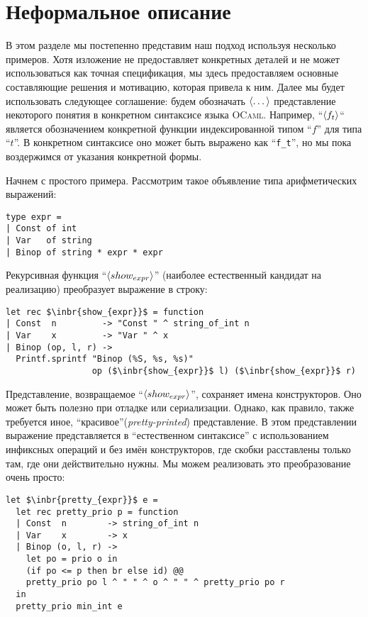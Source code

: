 \section{Неформальное описание}
\label{sec:expo}

В этом разделе мы постепенно представим наш подход используя несколько примеров. 
Хотя изложение не предоставляет конкретных деталей и не может использоваться как точная спецификация,
мы здесь предоставляем основные составляющие решения и мотивацию, которая привела к ним.
Далее мы будет использовать следующее соглашение: будем обозначать $\left<\dots\right>$ представление некоторого понятия в конкретном синтаксисе языка \textsc{OCaml}. Например, ``$\left<f_t\right>$`` является обозначением конкретной функции индексированной типом  ``$f$'' для типа ``$t$''. 
В конкретном синтаксисе оно может быть выражено как ``\lstinline{f_t}'', но мы пока воздержимся от указания конкретной формы.

Начнем с простого примера. Рассмотрим такое объявление типа арифметических выражений:

\begin{lstlisting}
type expr =
| Const of int
| Var   of string
| Binop of string * expr * expr
\end{lstlisting}

Рекурсивная функция ``$\left<show_{expr}\right>$'' (наиболее естественный кандидат на реализацию)
преобразует выражение в строку: 

\begin{lstlisting}
let rec $\inbr{show_{expr}}$ = function
| Const  n         -> "Const " ^ string_of_int n
| Var    x         -> "Var " ^ x
| Binop (op, l, r) ->
  Printf.sprintf "Binop (%S, %s, %s)" 
                 op ($\inbr{show_{expr}}$ l) ($\inbr{show_{expr}}$ r)
\end{lstlisting}

Представление, возвращаемое ``$\left<show_{expr}\right>$'', сохраняет имена конструкторов. Оно может быть
полезно при отладке или сериализации. Однако, как правило, также требуется иное, ``красивое''(\emph{pretty-printed}) представление. 
В этом представлении выражение представляется в ``естественном синтаксисе'' с использованием инфиксных операций и без имён 
конструкторов, где скобки расставлены только там, где они действительно нужны. Мы можем реализовать это преобразование 
очень просто:

\begin{lstlisting}
let $\inbr{pretty_{expr}}$ e =
  let rec pretty_prio p = function
  | Const  n        -> string_of_int n
  | Var    x        -> x
  | Binop (o, l, r) ->
    let po = prio o in
    (if po <= p then br else id) @@
    pretty_prio po l ^ " " ^ o ^ " " ^ pretty_prio po r
  in
  pretty_prio min_int e
\end{lstlisting}

